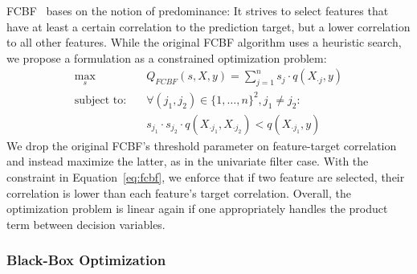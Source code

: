 \documentclass[conference]{IEEEtran}
\theoremstyle{definition}
\begin{document}
FCBF~\cite{yu2003feature} bases on the notion of predominance:
It strives to select features that have at least a certain correlation to the prediction target, but a lower correlation to all other features.
While the original FCBF algorithm uses a heuristic search, we propose a formulation as a constrained optimization problem:
%
\begin{equation}
	\begin{aligned}
	\max_s &\quad Q_{FCBF}(s,X,y) = \sum_{j=1}^{n} s_j \cdot q(X_{\cdot{}j},y) \\
	\text{subject to:} &\quad \forall (j_1,j_2) \in \{1, \dots, n\}^2, j_1 \neq j_2: \\
	&\quad s_{j_1} \cdot s_{j_2} \cdot q(X_{\cdot{}j_1}, X_{\cdot{}j_2}) < q(X_{\cdot{}j_1},y)
	\end{aligned}
	\label{eq:fcbf}
\end{equation}
%
We drop the original FCBF's threshold parameter on feature-target correlation and instead maximize the latter, as in the univariate filter case.
With the constraint in Equation~\ref{eq:fcbf}, we enforce that if two feature are selected, their correlation is lower than each feature's target correlation.
Overall, the optimization problem is linear again if one appropriately handles the product term between decision variables.

%

\subsubsection{Black-Box Optimization}
\label{sec:approach:objectives:black-box}
\end{document}
